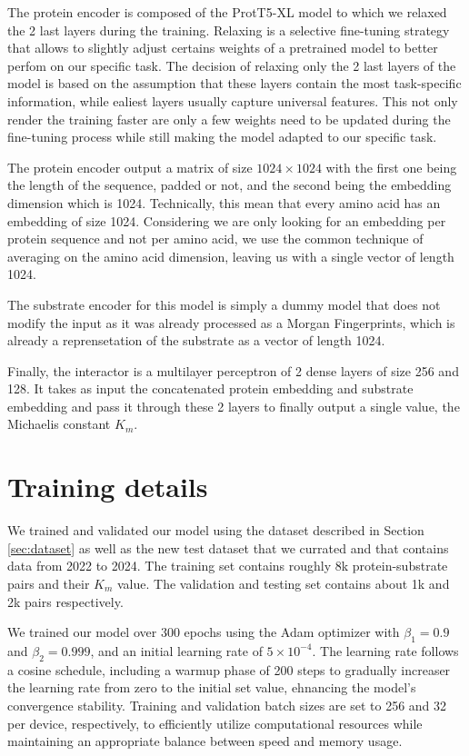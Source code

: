 The protein encoder is composed of the ProtT5-XL model to which we relaxed the 2 last layers during the training.
Relaxing is a selective fine-tuning strategy that allows to slightly adjust certains weights of a pretrained model 
to better perfom on our specific task. The decision of relaxing only the 2 last layers of the model is based on
the assumption that these layers contain the most task-specific information, while ealiest layers usually capture
universal features. This not only render the training faster are only a few weights need to be updated during the
fine-tuning process while still making the model adapted to our specific task.

The protein encoder output a matrix of size $1024\times 1024$ with the first one being the length of the sequence,
padded or not, and the second being the embedding dimension which is 1024. Technically, this mean that every
amino acid has an embedding of size 1024. Considering we are only looking for an embedding per protein sequence
and not per amino acid, we use the common technique of averaging on the amino acid dimension, leaving us with a
single vector of length 1024.

The substrate encoder for this model is simply a dummy model that does not modify the input as it was already
processed as a Morgan Fingerprints, which is already a reprensetation of the substrate as a vector of length 1024.

Finally, the interactor is a multilayer perceptron of 2 dense layers of size 256 and 128. It takes as input the
concatenated protein embedding and substrate embedding and pass it through these 2 layers to finally output a single
value, the Michaelis constant $K_m$.

\section{Training details}

We trained and validated our model using the dataset described in Section \ref{sec:dataset} as well as the new
test dataset that we currated and that contains data from 2022 to 2024. The training set contains roughly 8k
protein-substrate pairs and their $K_m$ value. The validation and testing set contains about 1k and 2k pairs
respectively. 

We trained our model over 300 epochs using the Adam optimizer with $\beta_1=0.9$ and $\beta_2=0.999$, and an initial
learning rate of $5\times10^{-4}$. The learning rate follows a cosine schedule, including a warmup phase of 200
steps to gradually increaser the learning rate from zero to the initial set value, ehnancing the model's convergence
stability. Training and validation batch sizes are set to 256 and 32 per device, respectively, to efficiently
utilize computational resources while maintaining an appropriate balance between speed and memory usage. 

